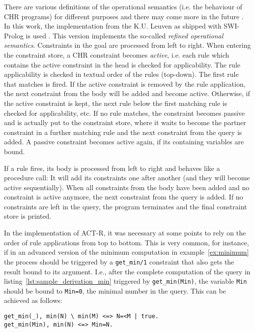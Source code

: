 There are various definitions of the operational semantics (i.e. the behaviour of CHR programs) for different purposes and there may come more in the future \cite[11]{fru_chr_book_2009}. In this work, the implementation from the K.U. Leuven as shipped with SWI-Prolog is used \cite{swi_prolog}. This version implements the so-called \emph{refined operational semantics}. Constraints in the goal are processed from left to right. When entering the constraint store, a CHR constraint becomes \emph{active}, i.e. each rule which contains the active constraint in the head is checked for applicability. The rule applicability is checked in textual order of the rules (top-down). The first rule that matches is fired. If the active constraint is removed by the rule application, the next constraint from the body will be added and become active. Otherwise, if the active constraint is kept, the next rule below the first matching rule is checked for applicability, etc. If no rule matches, the constraint becomes passive and is actually put to the constraint store, where it waits to become the partner constraint in a further matching rule and the next constraint from the query is added. A passive constraint becomes active again, if its containing variables are bound. 

If a rule fires, its body is processed from left to right and behaves like a procedure call: It will add its constraints one after another (and they will become active sequentially). When all constraints from the body have been added and no constraint is active anymore, the next constraint from the query is added. If no constraints are left in the query, the program terminates and the final constraint store is printed.

In the implementation of ACT-R, it was necessary at some points to rely on the order of rule applications from top to bottom. This is very common, for instance, if in an advanced version of the minimum computation in example~\ref{ex:minimum} the process should be triggered by a \lstinline|get_min/1| constraint that also gets the result bound to its argument. I.e., after the complete computation of the query in listing~\ref{lst:sample_derivation_min} triggered by \lstinline|get_min(Min)|, the variable \lstinline|Min| should be bound to \lstinline|Min=0|, the minimal number in the query. This can be achieved as follows:

\begin{lstlisting}[caption={Minimum program with trigger}]
get_min(_), min(N) \ min(M) <=> N=<M | true.
get_min(Min), min(N) <=> Min=N.
\end{lstlisting}

